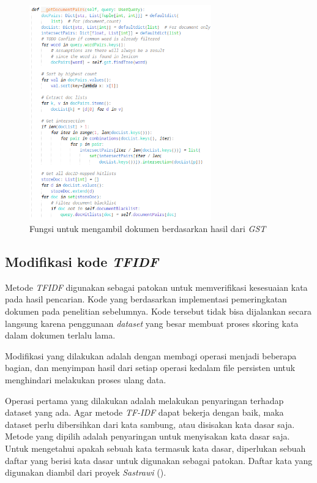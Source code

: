 \begin{figure}[H]
  \centering{}
	\includegraphics[width=0.7\textwidth]{gambar/implementasi_gst_getdocumentpairs}
  \caption{Fungsi untuk mengambil dokumen berdasarkan hasil dari \textit{GST}}
\end{figure}

\subsection{Modifikasi kode \textit{TF\-IDF}}

Metode \textit{TF\-IDF} digunakan sebagai patokan untuk memverifikasi kesesuaian 
kata pada hasil pencarian. Kode yang berdasarkan implementasi pemeringkatan 
dokumen pada penelitian sebelumnya. Kode tersebut tidak bisa dijalankan secara 
langsung karena penggunaan \textit{dataset} yang besar membuat proses skoring 
kata dalam dokumen terlalu lama.

Modifikasi yang dilakukan adalah dengan membagi operasi menjadi beberapa bagian, 
dan menyimpan hasil dari setiap operasi kedalam file persisten untuk menghindari 
melakukan proses ulang data.

Operasi pertama yang dilakukan adalah melakukan penyaringan terhadap dataset
yang ada. Agar metode \textit{TF-IDF} dapat bekerja dengan baik, maka dataset
perlu dibersihkan dari kata sambung, atau disisakan kata dasar saja. Metode yang
dipilih adalah penyaringan untuk menyisakan kata dasar saja. Untuk mengetahui 
apakah sebuah kata termasuk kata dasar, diperlukan sebuah daftar yang berisi 
kata dasar untuk digunakan sebagai patokan. Daftar kata yang digunakan diambil 
dari proyek \textit{Sastrawi} (\cite{sastrawi}).

